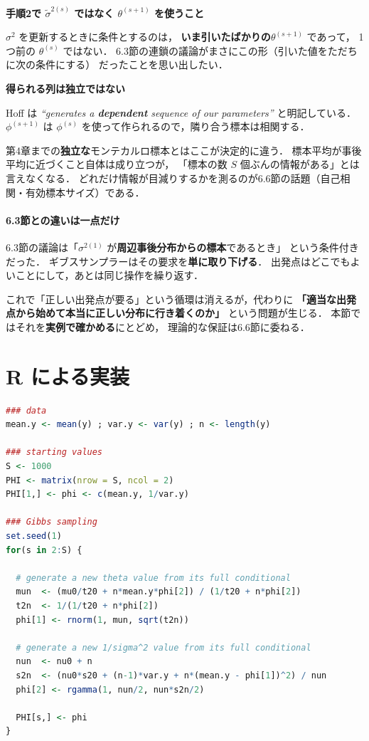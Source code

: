 \documentclass[lualatex,ja=standard,a4paper,12pt]{bxjsarticle}
\begin{document}
\begin{pointbox}
\textbf{手順2で $\tilde{\sigma}^{2(s)}$ ではなく $\theta^{(s+1)}$ を使うこと}

$\sigma^2$ を更新するときに条件とするのは，
\textbf{いま引いたばかりの}$\theta^{(s+1)}$ であって，
1つ前の $\theta^{(s)}$ ではない．
6.3節の連鎖の議論がまさにこの形（引いた値をただちに次の条件にする）
だったことを思い出したい．
\end{pointbox}

\begin{warningbox}
\textbf{得られる列は独立ではない}

Hoff は \textit{``generates a \textbf{dependent} sequence of our parameters''}
と明記している．
$\phi^{(s+1)}$ は $\phi^{(s)}$ を使って作られるので，隣り合う標本は相関する．

\medskip
第4章までの\textbf{独立な}モンテカルロ標本とはここが決定的に違う．
標本平均が事後平均に近づくこと自体は成り立つが，
「標本の数 $S$ 個ぶんの情報がある」とは言えなくなる．
どれだけ情報が目減りするかを測るのが6.6節の話題（自己相関・有効標本サイズ）である．
\end{warningbox}

\paragraph{6.3節との違いは一点だけ}
6.3節の議論は「$\sigma^{2(1)}$ が\textbf{周辺事後分布からの標本}であるとき」
という条件付きだった．
ギブスサンプラーはその要求を\textbf{単に取り下げる}．
出発点はどこでもよいことにして，あとは同じ操作を繰り返す．

\medskip
これで「正しい出発点が要る」という循環は消えるが，代わりに
\textbf{「適当な出発点から始めて本当に正しい分布に行き着くのか」}
という問題が生じる．
本節ではそれを\textbf{実例で確かめる}にとどめ，
理論的な保証は6.6節に委ねる．

\section{R による実装}

\begin{lstlisting}[language=R]
### data
mean.y <- mean(y) ; var.y <- var(y) ; n <- length(y)

### starting values
S <- 1000
PHI <- matrix(nrow = S, ncol = 2)
PHI[1,] <- phi <- c(mean.y, 1/var.y)

### Gibbs sampling
set.seed(1)
for(s in 2:S) {

  # generate a new theta value from its full conditional
  mun  <- (mu0/t20 + n*mean.y*phi[2]) / (1/t20 + n*phi[2])
  t2n  <- 1/(1/t20 + n*phi[2])
  phi[1] <- rnorm(1, mun, sqrt(t2n))

  # generate a new 1/sigma^2 value from its full conditional
  nun  <- nu0 + n
  s2n  <- (nu0*s20 + (n-1)*var.y + n*(mean.y - phi[1])^2) / nun
  phi[2] <- rgamma(1, nun/2, nun*s2n/2)

  PHI[s,] <- phi
}
\end{lstlisting}
\end{document}
